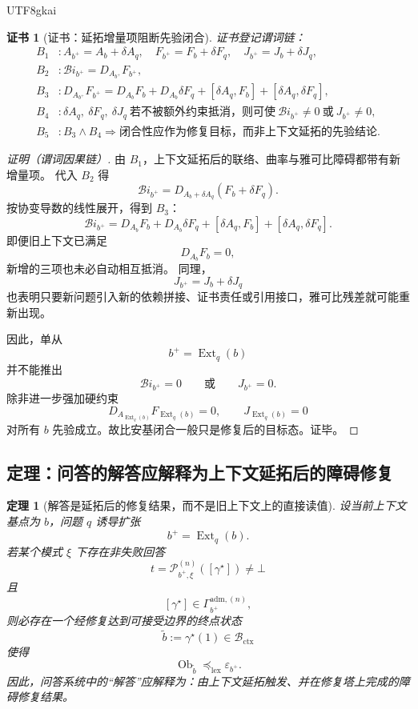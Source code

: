 \documentclass[12pt]{article}
\newtheorem{theorem}{定理}[section]
\newtheorem{Certificate}{证书}[section]
\begin{document}
\begin{CJK*}{UTF8}{gkai}
\begin{Certificate}[证书：延拓增量项阻断先验闭合]
\label{cert:tex37-ch4-bianchi-not-prior}
证书登记谓词链：
\[
\begin{aligned}
  B_1 &: A_{b^+}=A_b+\delta A_q,\quad F_{b^+}=F_b+\delta F_q,\quad J_{b^+}=J_b+\delta J_q,\\
  B_2 &: \mathcal{B}\!i_{b^+}=D_{A_{b^+}}F_{b^+},\\
  B_3 &: D_{A_{b^+}}F_{b^+}=D_{A_b}F_b + D_{A_b}\delta F_q + [\delta A_q,F_b] + [\delta A_q,\delta F_q],\\
  B_4 &: \delta A_q,\ \delta F_q,\ \delta J_q\ \text{若不被额外约束抵消，则可使}\ \mathcal{B}\!i_{b^+}\neq 0\ \text{或}\ J_{b^+}\neq 0,
    \\
  B_5 &: B_3\wedge B_4\Rightarrow \text{闭合性应作为修复目标，而非上下文延拓的先验结论}.
\end{aligned}
\]
\end{Certificate}

\begin{proof}[证明（谓词因果链）]
由 $B_1$，上下文延拓后的联络、曲率与雅可比障碍都带有新增量项。
代入 $B_2$ 得
\[
  \mathcal{B}\!i_{b^+}
  =
  D_{A_b+\delta A_q}(F_b+\delta F_q).
\]
按协变导数的线性展开，得到 $B_3$：
\[
  \mathcal{B}\!i_{b^+}
  =
  D_{A_b}F_b
  +
  D_{A_b}\delta F_q
  +
  [\delta A_q,F_b]
  +
  [\delta A_q,\delta F_q].
\]
即便旧上下文已满足
\[
  D_{A_b}F_b=0,
\]
新增的三项也未必自动相互抵消。
同理，
\[
  J_{b^+}=J_b+\delta J_q
\]
也表明只要新问题引入新的依赖拼接、证书责任或引用接口，雅可比残差就可能重新出现。

因此，单从
\[
  b^+=\operatorname{Ext}_q(b)
\]
并不能推出
\[
  \mathcal{B}\!i_{b^+}=0
  \qquad\text{或}\qquad
  J_{b^+}=0.
\]
除非进一步强加硬约束
\[
  D_{A_{\operatorname{Ext}_q(b)}}F_{\operatorname{Ext}_q(b)}=0,
  \qquad
  J_{\operatorname{Ext}_q(b)}=0
\]
对所有 $b$ 先验成立。故比安基闭合一般只是修复后的目标态。证毕。
\end{proof}

\subsection{定理：问答的解答应解释为上下文延拓后的障碍修复}
\label{subsec:tex37-ch4-answer}

\begin{theorem}[解答是延拓后的修复结果，而不是旧上下文上的直接读值]
\label{thm:tex37-ch4-answer-as-repair}
设当前上下文基点为 $b$，问题 $q$ 诱导扩张
\[
  b^+=\operatorname{Ext}_q(b).
\]
若某个模式 $\xi$ 下存在非失败回答
\[
  t=\mathcal{P}^{(n)}_{b^+,\xi}([\gamma^\star])\neq\bot
\]
且
\[
  [\gamma^\star]\in \Gamma_{b^+}^{\mathrm{adm},(n)},
\]
则必存在一个经修复达到可接受边界的终点状态
\[
  \tilde b:=\gamma^\star(1)\in \mathcal{B}_{\mathrm{ctx}}
\]
使得
\[
  \operatorname{Ob}_{\tilde b}
  \preceq_{\mathrm{lex}}
  \varepsilon_{b^+}.
\]
因此，问答系统中的“解答”应解释为：由上下文延拓触发、并在修复塔上完成的障碍修复结果。
\end{theorem}


\end{CJK*}
\end{document}
